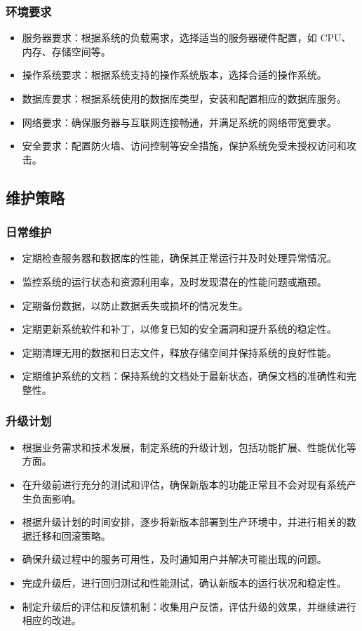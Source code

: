 \documentclass{article}
\begin{document}
\subsubsection{环境要求}
\begin{itemize}
	\item 服务器要求：根据系统的负载需求，选择适当的服务器硬件配置，如 CPU、内存、存储空间等。
	\item 操作系统要求：根据系统支持的操作系统版本，选择合适的操作系统。
	\item 数据库要求：根据系统使用的数据库类型，安装和配置相应的数据库服务。
	\item 网络要求：确保服务器与互联网连接畅通，并满足系统的网络带宽要求。
	\item 安全要求：配置防火墙、访问控制等安全措施，保护系统免受未授权访问和攻击。
\end{itemize}

\subsection{维护策略}
\subsubsection{日常维护}
\begin{itemize}
	\item 定期检查服务器和数据库的性能，确保其正常运行并及时处理异常情况。
	\item 监控系统的运行状态和资源利用率，及时发现潜在的性能问题或瓶颈。
	\item 定期备份数据，以防止数据丢失或损坏的情况发生。
	\item 定期更新系统软件和补丁，以修复已知的安全漏洞和提升系统的稳定性。
	\item 定期清理无用的数据和日志文件，释放存储空间并保持系统的良好性能。
	\item 定期维护系统的文档：保持系统的文档处于最新状态，确保文档的准确性和完整性。
\end{itemize}

\subsubsection{升级计划}
\begin{itemize}
	\item 根据业务需求和技术发展，制定系统的升级计划，包括功能扩展、性能优化等方面。
	\item 在升级前进行充分的测试和评估，确保新版本的功能正常且不会对现有系统产生负面影响。
	\item 根据升级计划的时间安排，逐步将新版本部署到生产环境中，并进行相关的数据迁移和回滚策略。
	\item 确保升级过程中的服务可用性，及时通知用户并解决可能出现的问题。
	\item 完成升级后，进行回归测试和性能测试，确认新版本的运行状况和稳定性。
	\item 制定升级后的评估和反馈机制：收集用户反馈，评估升级的效果，并继续进行相应的改进。
\end{itemize}
\end{document}
